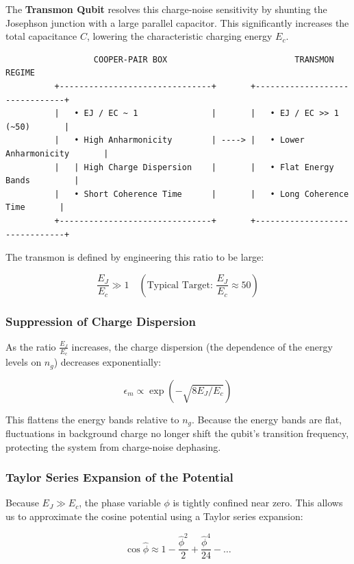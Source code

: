 \documentclass[
]{article}
\begin{document}
The \textbf{Transmon Qubit} resolves this charge-noise sensitivity by
shunting the Josephson junction with a large parallel capacitor. This
significantly increases the total capacitance \(C\), lowering the
characteristic charging energy \(E_c\).

\begin{verbatim}
                  COOPER-PAIR BOX                          TRANSMON REGIME
          +-------------------------------+       +-------------------------------+
          |   • EJ / EC ~ 1               |       |   • EJ / EC >> 1  (~50)       |
          |   • High Anharmonicity        | ----> |   • Lower Anharmonicity       |
          |   | High Charge Dispersion    |       |   • Flat Energy Bands         |
          |   • Short Coherence Time      |       |   • Long Coherence Time       |
          +-------------------------------+       +-------------------------------+
\end{verbatim}

The transmon is defined by engineering this ratio to be large:

\[\frac{E_J}{E_c} \gg 1 \quad (\text{Typical Target: } \frac{E_J}{E_c} \approx 50)\]

\subsubsection{Suppression of Charge
Dispersion}\label{suppression-of-charge-dispersion}

As the ratio \(\frac{E_J}{E_c}\) increases, the charge dispersion (the
dependence of the energy levels on \(n_g\)) decreases exponentially:

\[\epsilon_m \propto \exp\left(-\sqrt{8 E_J / E_c}\right)\]

This flattens the energy bands relative to \(n_g\). Because the energy
bands are flat, fluctuations in background charge no longer shift the
qubit's transition frequency, protecting the system from charge-noise
dephasing.

\subsubsection{Taylor Series Expansion of the
Potential}\label{taylor-series-expansion-of-the-potential}

Because \(E_J \gg E_c\), the phase variable \(\phi\) is tightly confined
near zero. This allows us to approximate the cosine potential using a
Taylor series expansion:

\[\cos \hat{\phi} \approx 1 - \frac{\hat{\phi}^2}{2} + \frac{\hat{\phi}^4}{24} - \dots\]
\end{document}
